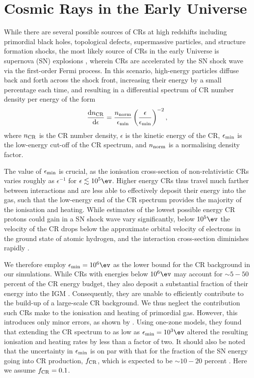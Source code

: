 \section{Cosmic Rays in the Early Universe}
\label{sec:context}
While there are several possible sources of CRs at high redshifts including primordial black holes, topological defects, supermassive particles, and structure formation shocks, the most likely source of CRs in the early Universe is supernova (SN) explosions \citep[e.g.,][]{GinzburgSyrovatskii1969,BiermannSigl2001,Stanev2004,Pfrommeretal2006}, wherein CRs are accelerated by the SN shock wave via the first-order Fermi process.  In this scenario, high-energy particles diffuse back and forth across the shock front, increasing their energy by a small percentage each time, and resulting in a differential spectrum of CR number density per energy \citep{Longair1994} of the form
\begin{equation}
    \frac{{\rm d}n_{\rm \small CR}}{{\rm d}\epsilon} = \frac{n_{\rm norm}}{\epsilon_{\rm min}}
    \left( \frac{\epsilon}{\epsilon_{\rm min}} \right)^{-2},
\end{equation}
where $n_{\rm \small CR}$ is the CR number density, $\epsilon$ is the kinetic energy of the CR, $\epsilon_{\rm min}$ is the low-energy cut-off of the CR spectrum, and $n_{\rm norm}$ is a normalising density factor. 

The value of $\epsilon_{\rm min}$ is crucial, as the ionisation cross-section of non-relativistic CRs varies roughly as $\epsilon^{-1}$ for $\epsilon \lesssim 10^5\ev$. Higher energy CRs thus travel much farther between interactions and are less able to effectively deposit their energy into the gas, such that the low-energy end of the CR spectrum provides the majority of the ionisation and heating.  While estimates of the lowest possible energy CR protons could gain in a SN shock wave vary significantly, below $10^5\ev$ the velocity of the CR drops below the approximate orbital velocity of electrons in the ground state of atomic hydrogen, and the interaction cross-section diminishes rapidly \citep{Schlickeiser2002}. 

We therefore employ $\epsilon_{\rm min} = 10^6\ev$ as the lower bound for the CR background in our simulations.  While CRs with energies below $10^6\ev$ may account for $\sim$$5-50$ percent of the CR energy budget, they also deposit a substantial fraction of their energy into the IGM \citep{SazonovSunyaev2015}. Consequently, they are unable to efficiently contribute to the build-up of a large-scale CR background. We thus neglect the contribution such CRs make to the ionisation and heating of primordial gas. However, this introduces only minor errors, as shown by \citet{StacyBromm2007}. Using one-zone models, they found that extending the CR spectrum to as low as $\epsilon_{\rm min} = 10^3\ev$ altered the resulting ionisation and heating rates by less than a factor of two.  It should also be noted that the uncertainty in $\epsilon_{\rm min}$ is on par with that for the fraction of the SN energy going into CR production, $f_{\rm \small CR}$, which is expected to be $\sim$$10-20$ percent \citep{CaprioliSpitkovsky2014}.  Here we assume $f_{\rm \small CR} = 0.1$.


